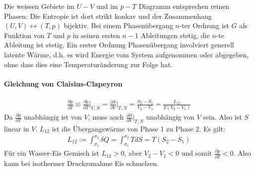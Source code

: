 Die weissen Gebiete im $U-V$ und im $p-T$ Diagramm entsprechen reinen Phasen:
Die Entropie ist dort strikt konkav und der Zusammenhang $(U,V) \leftrightarrow
(T,p)$ bijektiv. Bei einem Phasenübergang $n$-ter Ordnung ist $G$ als Funktion
von $T$ und $p$ in seinen ersten $n-1$ Ableitungen stetig, die $n$-te
Ableitung ist stetig. Ein erster Ordnung Phasenübergang involviert generell
latente Wärme, d.h. es wird Energie vom System aufgenommen oder abgegeben,
ohne dass dies eine Temperaturänderung zur Folge hat.

\paragraph{Gleichung von Claisius-Clapeyron}
\begin{align*}
    \frac{\partial p}{\partial T} \equiv
    \frac{\partial p}{\partial T} \Big|_{V,N}
    = \frac{\partial S}{\partial V} \Big|_{T,N}
    = \frac{S_2 - S_1}{V_2 - V_1}
    = \frac{L_{12}}{T (V_2 - V_1)}
\end{align*}
Da $\frac{\partial p}{\partial T}$ unabhängig ist von $V$, muss auch
$\frac{\partial S}{\partial V} \Big|_{T,N}$ unabhängig von $V$ sein. Also ist
$S$ linear in $V$. $L_{12}$ ist die Übergangswärme von Phase 1 zu Phase 2.
Es gilt:
\begin{align*}
    L_{12} := \int_{\sigma_1}^{\sigma_2} \delta Q
    = \int_{\sigma_1}^{\sigma_2} T dS = T (S_2 - S_1)
\end{align*}
Für ein Wasser-Eis Gemisch ist $L_{12} > 0$, aber $V_2 - V_1 < 0$ und
somit $\frac{\partial p}{\partial T} < 0$. Also kann bei isothermer
Druckzunahme Eis schmelzen.

